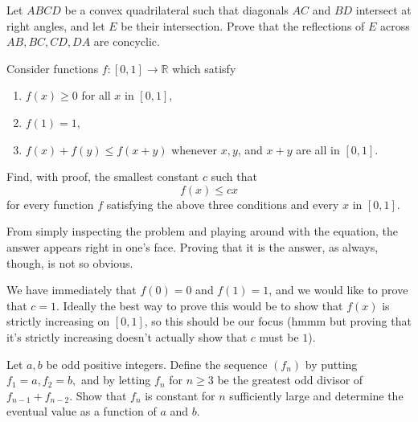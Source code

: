 \documentclass[a4paper, 10pt]{article}
\begin{document}
\begin{chirpbox}
\begin{problemnum}
    Let \( ABCD \) be a convex quadrilateral such that diagonals \( AC \) and \( BD \) intersect at right angles, and let \( E \) be their intersection. Prove that the reflections of \( E \) across \( AB, BC, CD, DA \) are concyclic. 
\end{problemnum}
\end{chirpbox}

\begin{chirpbox}
\begin{problemnum}
    Consider functions \( f : [0, 1] \to \mathbb{R} \) which satisfy
    \begin{enumerate}
        \item \( f(x) \ge 0 \) for all \( x \) in \( [0, 1] \),
        \item \( f(1) = 1 \),
        \item \( f(x) + f(y) \le f(x + y) \) whenever \( x, y \), and \( x + y \) are all in \( [0, 1] \).
    \end{enumerate}
    Find, with proof, the smallest constant \( c \) such that
    \[
        f(x) \le cx
    \]
    for every function \( f \) satisfying the above three conditions and every \( x \) in \( [0, 1] \).
\end{problemnum}
\end{chirpbox}

\begin{solution}
    From simply inspecting the problem and playing around with the equation, the answer appears right in one's face. Proving that it is the answer, as always, though, is not so obvious.

    We have immediately that \( f(0) = 0 \) and \( f(1) = 1 \), and we would like to prove that \( c = 1 \). Ideally the best way to prove this would be to show that \( f(x) \) is strictly increasing on \( [0, 1] \), so this should be our focus (hmmm but proving that it's strictly increasing doesn't actually show that \( c \) must be \( 1 \)).
\end{solution}

\begin{chirpbox}
\begin{problemnum}
    Let \( a, b \) be odd positive integers. Define the sequence \( (f_n) \) by
    putting \( f_1 = a, f_2 = b, \) and by letting \( f_n \) for \( n \ge 3 \)
    be the greatest odd divisor of \( f_{n-1} + f_{n-2} \). Show that \( f_n \)
    is constant for \( n \) sufficiently large and determine the eventual value
    as a function of \( a \) and \( b \).
\end{problemnum}
\end{chirpbox}
\end{document}
